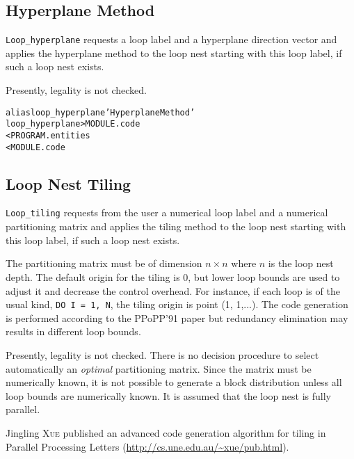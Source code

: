 \documentclass[a4paper]{report}
\newenvironment{PipsMake}{\begin{alltt}}{\end{alltt}}
\begin{document}
\subsection{Hyperplane Method}
\label{subsection-hyperplane-method}

\verb/Loop_hyperplane/ requests a loop label and a hyperplane direction
vector and applies the hyperplane method to the loop nest starting with this
loop label, if such a loop nest exists.

Presently, legality is not checked.

\begin{PipsMake}
alias loop_hyperplane 'Hyperplane Method'
loop_hyperplane                            > MODULE.code
        < PROGRAM.entities
        < MODULE.code
\end{PipsMake}

\subsection{Loop Nest Tiling}
\label{subsection-loop-nest-tiling}

\verb/Loop_tiling/ requests from the user a numerical loop label and a
numerical partitioning matrix and applies the tiling method to the loop
nest starting with this loop label, if such a loop nest exists.

The partitioning matrix must be of dimension $n \times n$ where $n$ is the
loop nest depth. The default origin for the tiling is 0, but lower loop
bounds are used to adjust it and decrease the control overhead. For
instance, if each loop is of the usual kind, \verb+DO I = 1, N+, the
tiling origin is point (1, 1,...). The code generation is performed
according to the PPoPP'91 paper but redundancy elimination may results in
different loop bounds.

Presently, legality is not checked. There is no decision procedure to
select automatically an {\em optimal} partitioning matrix. Since the
matrix must be numerically known, it is not possible to generate a block
distribution unless all loop bounds are numerically known. It is assumed
that the loop nest is fully parallel.

Jingling \textsc{Xue} published an advanced code generation algorithm for
tiling in Parallel Processing Letters
(\url{http://cs.une.edu.au/~xue/pub.html}).
\end{document}
